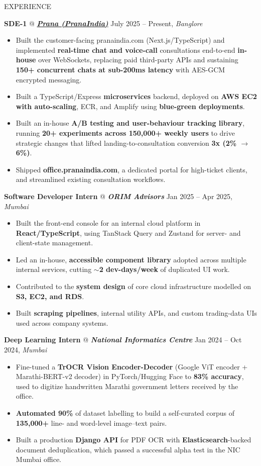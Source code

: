 \documentclass{resume} %
\makeatletter
\newcommand{\experience}[5]{
    \textbf{#1} @ \textit{\textbf{#2}} \hfill #3, \textit{#4}
    \vspace{-7pt}
    \begin{itemize}[leftmargin=*]
        \itemsep -7pt {}
        #5
    \end{itemize}
    \vspace{-4pt}
}
\makeatother
\begin{document}

\begin{rSection}{EXPERIENCE}

\experience{SDE-1}{\href{https://pranaindia.com}{Prana (PranaIndia)}}{July 2025 -- Present}{Banglore}{
    \item Built the customer-facing pranaindia.com (Next.js/TypeScript) and implemented \textbf{real-time chat and voice-call} consultations end-to-end \textbf{in-house} over WebSockets, replacing paid third-party APIs and sustaining \textbf{150+ concurrent chats at sub-200ms latency} with AES-GCM encrypted messaging.
    \item Built a TypeScript/Express \textbf{microservices} backend, deployed on \textbf{AWS EC2 with auto-scaling}, ECR, and Amplify using \textbf{blue-green deployments}.
    \item Built an in-house \textbf{A/B testing and user-behaviour tracking library}, running \textbf{20+ experiments across 150,000+ weekly users} to drive strategic changes that lifted landing-to-consultation conversion \textbf{3x (2\% $\to$ 6\%)}.
    \item Shipped \textbf{office.pranaindia.com}, a dedicated portal for high-ticket clients, and streamlined existing consultation workflows.
}

\experience{Software Developer Intern}{ORIM Advisors}{Jan 2025 -- Apr 2025}{Mumbai}{
    \item Built the front-end console for an internal cloud platform in \textbf{React/TypeScript}, using TanStack Query and Zustand for server- and client-state management.
    \item Led an in-house, \textbf{accessible component library} adopted across multiple internal services, cutting \textbf{{$\sim$}2 dev-days/week} of duplicated UI work.
    \item Contributed to the \textbf{system design} of core cloud infrastructure modelled on \textbf{S3, EC2, and RDS}.
    \item Built \textbf{scraping pipelines}, internal utility APIs, and custom trading-data UIs used across company systems.
}

\experience{Deep Learning Intern}{National Informatics Centre}{Jan 2024 -- Oct 2024}{Mumbai}{
    \item Fine-tuned a \textbf{TrOCR Vision Encoder-Decoder} (Google ViT encoder + Marathi-BERT-v2 decoder) in PyTorch/Hugging Face to \textbf{83\% accuracy}, used to digitize handwritten Marathi government letters received by the office.
    \item \textbf{Automated 90\%} of dataset labelling to build a self-curated corpus of \textbf{135,000+} line- and word-level image--text pairs.
    \item Built a production \textbf{Django API} for PDF OCR with \textbf{Elasticsearch}-backed document deduplication, which passed a successful alpha test in the NIC Mumbai office.
}


\end{rSection}
\end{document}

